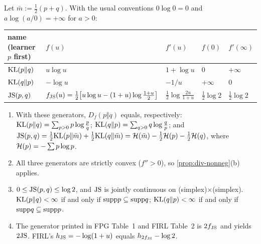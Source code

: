 \begin{proposition}\label{prop:div-generators}
Let $\bar m:=\frac12(p+q)$. With the usual conventions $0\log0=0$ and $a\log(a/0)=+\infty$ for $a>0$:
\begin{center}
\begin{tabular}{@{}lllll@{}}
\toprule
name (learner $p$ first) & $f(u)$ & $f'(u)$ & $f(0)$ & $f'(\infty)$\\
\midrule
$\mathrm{KL}(p\Vert q)$ & $u\log u$ & $1+\log u$ & $0$ & $+\infty$\\
$\mathrm{KL}(q\Vert p)$ & $-\log u$ & $-1/u$ & $+\infty$ & $0$\\
$\mathrm{JS}(p,q)$ & $f_{\mathrm{JS}}(u)=\tfrac12\big[u\log u-(1+u)\log\tfrac{1+u}2\big]$ & $\tfrac12\log\tfrac{2u}{1+u}$ & $\tfrac12\log2$ & $\tfrac12\log2$\\
\bottomrule
\end{tabular}
\end{center}
\begin{enumerate}[nosep,label=(\alph*)]
\item With these generators, $D_f(p\Vert q)$ equals, respectively:
  $\mathrm{KL}(p\Vert q)=\sum_{p>0}p\log\frac pq$;
  $\mathrm{KL}(q\Vert p)=\sum_{q>0}q\log\frac qp$;
  and $\mathrm{JS}(p,q)=\frac12\mathrm{KL}(p\Vert\bar m)+\frac12\mathrm{KL}(q\Vert\bar m)=\mathcal{H}(\bar m)-\frac12\mathcal{H}(p)-\frac12\mathcal{H}(q)$, where $\mathcal{H}(p)=-\sum p\log p$.
\item All three generators are strictly convex ($f''>0$), so \cref{prop:div-nonneg}(b) applies.
\item $0\le\mathrm{JS}(p,q)\le\log2$, and $\mathrm{JS}$ is jointly continuous on (simplex)$\times$(simplex).
  $\mathrm{KL}(p\Vert q)<\infty$ if and only if $\mathrm{supp} p\subseteq\mathrm{supp} q$; $\mathrm{KL}(q\Vert p)<\infty$ if and only if $\mathrm{supp} q\subseteq\mathrm{supp} p$.
\item The generator printed in FPG Table~1 and FIRL Table~2 is $2f_{\mathrm{JS}}$ and yields $2\mathrm{JS}$. FIRL's $h_{\mathrm{JS}}=-\log(1+u)$ equals $h_{2f_{\mathrm{JS}}}-\log2$.
\end{enumerate}
\end{proposition}
